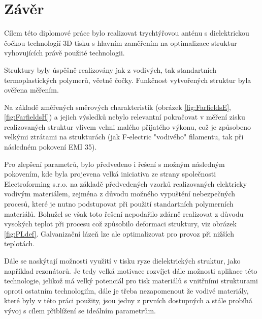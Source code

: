 \chapter{Závěr}
Cílem této diplomové práce bylo realizovat trychtýřovou anténu s dielektrickou čočkou technologií 3D tisku s hlavním zaměřením na optimalizace struktur vyhovujících právě použité technologii. 

Struktury byly úspěšně realizovány jak z vodivých, tak standartních termoplastických polymerů, včetně čočky. Funkčnost vytvořených struktur byla ověřena měřením.

Na základě změřených směrových charakteristik (obrázek \ref{fig:FarfieldsE}, \ref{fig:FarfieldsH}) a jejich výsledků nebylo relevantní pokračovat v měření zisku realizovaných struktur vlivem velmi malého přijatého výkonu, což je způsobeno velkými ztrátami na strukturách (jak F-electric "vodivého" filamentu, tak při následném pokovení EMI 35).

Pro zlepšení parametrů, bylo předvedeno i řešení s možným následným pokovením, kde byla projevena velká iniciativa ze strany společnosti Electroforming s.r.o. na základě předvedených vzorků realizovaných elektricky vodivým materiálem, zejména z důvodu možného vypuštění nebezpečných procesů, které je nutno podstupovat při použití standartních polymerních materiálů. Bohužel se však toto řešení nepodařilo zdárně realizovat z důvodu vysokých teplot při procesu což způsobilo deformaci struktury, viz obrázek \ref{fig:PLdef}. Galvanizační lázeň lze ale optimalizovat pro provoz při nižších teplotách.

Dále se naskýtají možnosti využití v tisku ryze dielektrických struktur, jako například rezonátorů. Je tedy velká motivace rozvíjet dále možnosti aplikace této technologie, jelikož má velký potenciál pro tisk materiálů s vnitřními strukturami oproti ostatním technologiím, dále je třeba nezapomenout že vodivé materiály, které byly v této práci použity, jsou jedny z prvních dostupných a stále probíhá vývoj s cílem přiblížení se ideálním parametrům.


